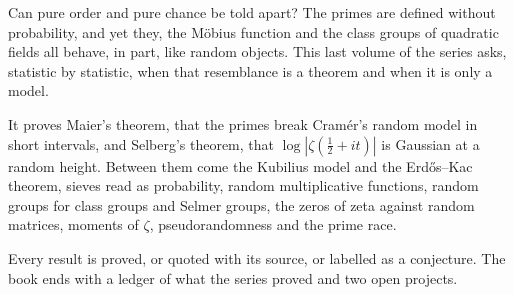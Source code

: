 Can pure order and pure chance be told apart? The primes are defined without probability, and yet they, the M\"obius function and the class groups of quadratic fields all behave, in part, like random objects.
This last volume of the series asks, statistic by statistic, when that resemblance is a theorem and when it is only a model.\par\medskip
It proves Maier's theorem, that the primes break Cram\'er's random model in short intervals, and Selberg's theorem, that $\log|\zeta(\frac12+it)|$ is Gaussian at a random height. Between them come the Kubilius model and the Erd\H os--Kac theorem, sieves read as probability, random multiplicative functions, random groups for class groups and Selmer groups, the zeros of zeta against random matrices, moments of $\zeta$, pseudorandomness and the prime race.\par\medskip
Every result is proved, or quoted with its source, or labelled as a conjecture. The book ends with a ledger of what the series proved and two open projects.
